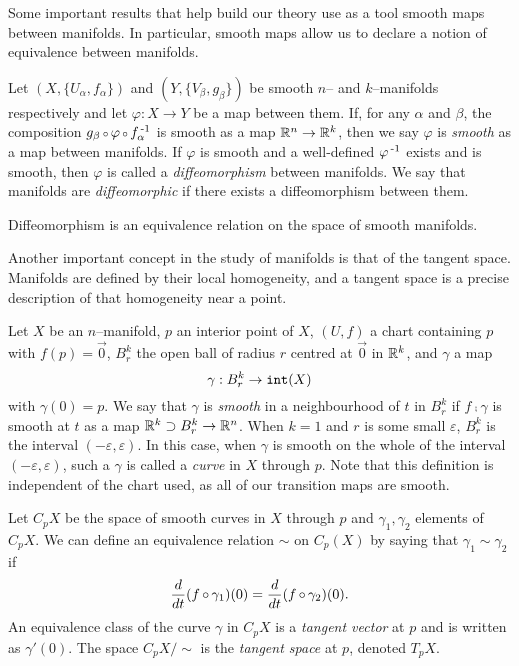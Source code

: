 Some important results that help build our theory use as a tool smooth maps between manifolds.
In particular, smooth maps allow us to declare a notion of equivalence between manifolds.

\begin{defn}
	\label{def:smoothmap}
	Let $(X,\{U_\alpha,f_\alpha\})$ and $(Y,\{V_\beta,g_\beta\})$ be smooth $n$-- and $k$--manifolds respectively and let $\varphi:X\to Y$ be a map between them.
	If, for any $\alpha$ and $\beta$, the composition $g_\beta\comp \varphi\comp f_\alpha\inv$ is smooth as a map $\mathbb{R}^n\to\mathbb{R}^k$, then we say $\varphi$ is \emph{smooth} as a map between manifolds.
	If $\varphi$ is smooth and a well-defined $\varphi^{\,\text{-}1}$ exists and is smooth, then $\varphi$ is called a \emph{diffeomorphism} between manifolds.
	We say that manifolds are \emph{diffeomorphic} if there exists a diffeomorphism between them.
\end{defn}

\begin{prop}
	\label{prop:diffeoequiv}
	Diffeomorphism is an equivalence relation on the space of smooth manifolds.
\end{prop}

Another important concept in the study of manifolds is that of the tangent space.
Manifolds are defined by their local homogeneity, and a tangent space is a precise description of that homogeneity near a point.

\begin{defn}
	\label{def:tangentspace}
	Let $X$ be an $n$--manifold, $p$ an interior point of $X$, $(U,f)$ a chart containing $p$ with $f(p)=\vec{0}$, $B_r^k$ the open ball of radius $r$ centred at $\vec{0}$ in $\mathbb{R}^k$, and $\gamma$ a map $$\gamma:B_r^k\to \mathtt{int}(X)$$
	with $\gamma(0)=p$.
	We say that $\gamma$ is \emph{smooth} in a neighbourhood of $t$ in $B_r^k$ if $f\comp\gamma$ is smooth at $t$ as a map $\mathbb{R}^k\supset B_r^k\to\mathbb{R}^n$.
	When $k=1$ and $r$ is some small $\varepsilon$, $B_r^k$ is the interval $(-\varepsilon, \varepsilon)$.
	In this case, when $\gamma$ is smooth on the whole of the interval $(-\varepsilon, \varepsilon)$, such a $\gamma$ is called a \emph{curve} in $X$ through $p$.
	Note that this definition is independent of the chart used, as all of our transition maps are smooth.
	
	Let $C_p X$ be the space of smooth curves in $X$ through $p$ and $\gamma_1, \gamma_2$ elements of $C_p X$.
	We can define an equivalence relation $\sim$ on $C_p(X)$ by saying that $\gamma_1\sim\gamma_2$ if
	\[
		\Ddt(f\comp\gamma_1)(0) = \Ddt(f\comp\gamma_2)(0).
	\]
	An equivalence class of the curve $\gamma$ in $C_p X$ is a \emph{tangent vector} at $p$ and is written as $\gamma'(0)$.
	The space $C_p X/\sim$ is the \emph{tangent space} at $p$, denoted $T_p X$.	
\end{defn}

